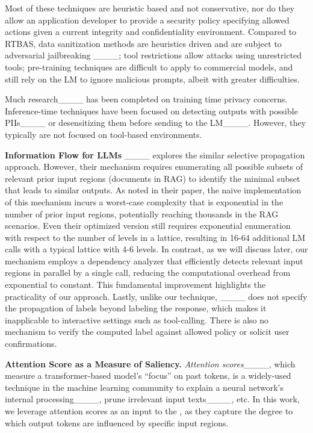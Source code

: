 Most of these techniques are heuristic based and not conservative, nor do they allow an application developer to provide a security policy specifying allowed actions given a current integrity and confidentiality environment. Compared to RTBAS, data sanitization methods are heuristics driven and are subject to adversarial jailbreaking  ____; tool restrictions allow attacks using unrestricted tools; pre-training techniques are difficult to apply to commercial models, and still rely on the LM to ignore malicious prompts, albeit with greater difficulties. 

Much research____ has been completed on training time privacy concerns. Inference-time techniques have been focused on detecting outputs with possible PIIs____ or desensitizing them before sending to the LM____. However, they typically are not focused on tool-based environments.

\textbf{Information Flow for LLMs} 
____ explores the similar selective propagation approach. However,  their mechanism requires enumerating all possible subsets of relevant prior input regions (documents in RAG) to identify the minimal subset that leads to similar outputs. As noted in their paper, the naive implementation of this mechanism incurs a worst-case complexity that is exponential in the number of prior input regions, potentially reaching thousands in the RAG scenarios. Even their optimized version still requires exponential enumeration with respect to the number of levels in a lattice, resulting in 16-64 additional LM calls with a typical lattice with 4-6 levels. In contrast, as we will discuss later, our mechanism employs a dependency analyzer that efficiently detects relevant input regions in parallel by a single call, reducing the computational overhead from exponential to constant. This fundamental improvement highlights the practicality of our approach. Lastly, unlike our technique, ____ does not specify the propagation of labels beyond labeling the response, which makes it inapplicable to interactive settings such as tool-calling. There is also no mechanism to verify the computed label against allowed policy or solicit user confirmations. 


\textbf{Attention Score as a Measure of Saliency.}
\textit{Attention scores}____, which measure a transformer-based model's ``focus'' on past tokens, is a widely-used technique in the machine learning community to explain a neural network's internal processing____, prune irrelevant input texts____, etc.  In this work, we leverage attention scores as an input to the \dependencydetector, as they capture the degree to which output tokens are influenced by specific input regions.